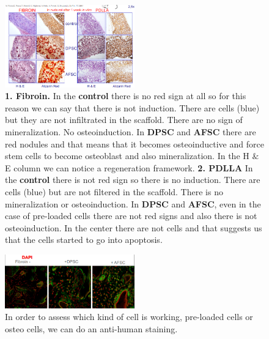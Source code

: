     \begin{figure}[H]
        \centering
        \includegraphics[width=0.5\textwidth]{implant_fibroin.png}
    \caption{\label{fig:implant_fibroin} \textbf{1. Fibroin.} In the \textbf{control} there is no red sign at all so for this reason we can say that there is not induction. There are cells (blue) but they are not infiltrated in the scaffold. There are no sign of mineralization. No osteoinduction. In \textbf{DPSC} and \textbf{AFSC} there are red nodules and that means that it becomes osteoinductive and force stem cells to become osteoblast and also mineralization. In the H $\&$ E column we can notice a regeneration framework. \textbf{2. PDLLA} In the \textbf{control} there is not red sign so there is no induction. There are cells (blue) but are not filtered in the scaffold. There is no mineralization or osteoinduction. In \textbf{DPSC} and \textbf{AFSC}, even in the case of pre-loaded cells there are not red signs and also there is not osteoinduction. In the center there are not cells and that suggests us that the cells started to go into apoptosis.}
    \end{figure}

    \begin{figure}[H]
        \centering
        \includegraphics[width=0.5\textwidth]{fibroin_confocal.png}
    \caption{\label{fig:fibroin_confocal} In order to assess which kind of cell is working, pre-loaded cells or osteo cells, we can do an anti-human staining.}
    \end{figure}

